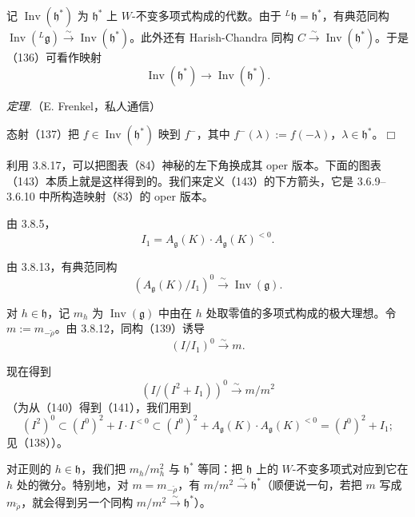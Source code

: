 记 $\operatorname{Inv}(\mathfrak{h}^{*})$ 为 $\mathfrak{h}^{*}$ 上 $W$-不变多项式构成的代数。由于 ${}^{L}\mathfrak{h}=\mathfrak{h}^{*}$，有典范同构 $\operatorname{Inv}({}^{L}\mathfrak{g})\xrightarrow{\sim}\operatorname{Inv}(\mathfrak{h}^{*})$。此外还有 Harish-Chandra 同构 $C\xrightarrow{\sim}\operatorname{Inv}(\mathfrak{h}^{*})$。于是（136）可看作映射
\begin{equation}\tag{137}
  \operatorname{Inv}(\mathfrak{h}^{*})\to\operatorname{Inv}(\mathfrak{h}^{*}).
\end{equation}

 \emph{定理.}（E. Frenkel，私人通信）

态射（137）把 $f\in\operatorname{Inv}(\mathfrak{h}^{*})$ 映到 $f^{-}$，其中 $f^{-}(\lambda):=f(-\lambda)$，$\lambda\in\mathfrak{h}^{*}$。\hfill$\Box$

 利用 3.8.17，可以把图表（84）神秘的左下角换成其 oper 版本。下面的图表（143）本质上就是这样得到的。我们来定义（143）的下方箭头，它是 3.6.9--3.6.10 中所构造映射（83）的 oper 版本。

由 3.8.5，
\begin{equation}\tag{138}
  I_{1}=A_{\mathfrak{g}}(K)\cdot A_{\mathfrak{g}}(K)^{<0}.
\end{equation}

由 3.8.13，有典范同构
\begin{equation}\tag{139}
  (A_{\mathfrak{g}}(K)/I_{1})^{0}\xrightarrow{\sim}\operatorname{Inv}(\mathfrak{g}).
\end{equation}

对 $h\in\mathfrak{h}$，记 $m_{h}$ 为 $\operatorname{Inv}(\mathfrak{g})$ 中由在 $h$ 处取零值的多项式构成的极大理想。令 $m:=m_{-\check\rho}$。由 3.8.12，同构（139）诱导
\begin{equation}\tag{140}
  (I/I_{1})^{0}\xrightarrow{\sim}m.
\end{equation}

现在得到
\begin{equation}\tag{141}
  (I/(I^{2}+I_{1}))^{0}\xrightarrow{\sim}m/m^{2}
\end{equation}
（为从（140）得到（141），我们用到
\[
(I^{2})^{0}\subset(I^{0})^{2}+I\cdot I^{<0}\subset(I^{0})^{2}+A_{\mathfrak{g}}(K)\cdot A_{\mathfrak{g}}(K)^{<0}=(I^{0})^{2}+I_{1};
\]
见（138））。

对正则的 $h\in\mathfrak{h}$，我们把 $m_{h}/m_{h}^{2}$ 与 $\mathfrak{h}^{*}$ 等同：把 $\mathfrak{h}$ 上的 $W$-不变多项式对应到它在 $h$ 处的微分。特别地，对 $m=m_{-\check\rho}$，有 $m/m^{2}\xrightarrow{\sim}\mathfrak{h}^{*}$（顺便说一句，若把 $m$ 写成 $m_{\check\rho}$，就会得到另一个同构 $m/m^{2}\xrightarrow{\sim}\mathfrak{h}^{*}$）。


